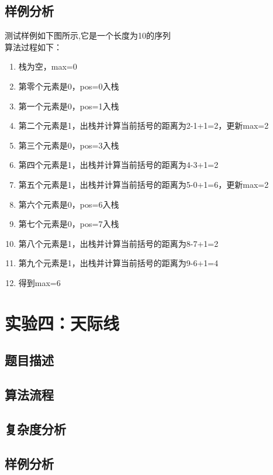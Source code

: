 \documentclass[UTF8,a4paperdui, %
]{ctexart}
\begin{document}
\subsection{样例分析}
测试样例如下图所示,它是一个长度为10的序列\\
算法过程如下：
\begin{enumerate}
    \item 栈为空，max=0
    \item 第零个元素是0，pos=0入栈
    \item 第一个元素是0，pos=1入栈
    \item 第二个元素是1，出栈并计算当前括号的距离为2-1+1=2，更新max=2
    \item 第三个元素是0，pos=3入栈
    \item 第四个元素是1，出栈并计算当前括号的距离为4-3+1=2
    \item 第五个元素是1，出栈并计算当前括号的距离为5-0+1=6，更新max=2
    \item 第六个元素是0，pos=6入栈
    \item 第七个元素是0，pos=7入栈
    \item 第八个元素是1，出栈并计算当前括号的距离为8-7+1=2
    \item 第九个元素是1，出栈并计算当前括号的距离为9-6+1=4
    \item 得到max=6
\end{enumerate}

\newpage
\section{实验四：天际线}

\subsection{题目描述}

\subsection{算法流程}

\subsection{复杂度分析}

\subsection{样例分析}
\end{document}

